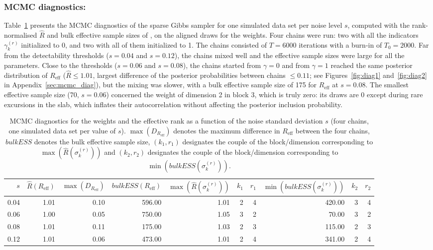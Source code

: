 \documentclass[11pt]{article}
\newcommand{\Reff}{R_{\mathrm{eff}}}
\begin{document}
\subsubsection*{MCMC diagnostics:} Table~\ref{tab:mcmc_diag} presents the MCMC diagnostics of the sparse Gibbs sampler for one simulated data set per noise level $s$, computed with the rank-normalised $\hat R$ and bulk effective sample sizes of \citet{vehtari2021}, on the aligned draws for the weights. Four chains were run: two with all the indicators $\gamma_k^{(r)}$ initialized to 0, and two with all of them initialized to 1. The chains consisted of $T=6000$ iterations with a burn-in of $T_0=2000$. Far from the detectability thresholds ($s=0.04$ and $s=0.12$), the chains mixed well and the effective sample sizes were large for all the parameters. Close to the thresholds ($s=0.06$ and $s=0.08$), the chains started from $\gamma=0$ and from $\gamma=1$ reached the same posterior distribution of $\Reff$ ($\hat R\leq1.01$, largest difference of the posterior probabilities between chains $\leq0.11$; see Figures~\ref{fig:diag1} and~\ref{fig:diag2} in Appendix~\ref{sec:mcmc_diag}), but the mixing was slower, with a bulk effective sample size of 175 for $\Reff$ at $s=0.08$. The smallest effective sample size (70, $s=0.06$) concerned the weight of dimension 2 in block 3, which is truly zero: its draws are 0 except during rare excursions in the slab, which inflates their autocorrelation without affecting the posterior inclusion probability.  
\begin{table}[ht]
\centering
\begin{tabular}{rrrrrrrrrr}
  \hline
$s$ & $\hat R(\Reff)$ & $\max(D_{\Reff})$ & $bulkESS(\Reff)$ & $\max(\hat R(\sigma^{(r)}_k))$ &  $k_1$ & $r_1$ & $\min(bulkESS(\sigma^{(r)}_k))$ & $k_2$ & $r_2$ \\ 
  \hline
0.04 & 1.01 & 0.10 & 596.00 & 1.01 &   2 &   4 & 420.00 &   3 &   4 \\ 
  0.06 & 1.00 & 0.05 & 750.00 & 1.05 &   3 &   2 & 70.00 &   3 &   2 \\ 
  0.08 & 1.01 & 0.11 & 175.00 & 1.03 &   2 &   3 & 115.00 &   2 &   3 \\ 
  0.12 & 1.01 & 0.06 & 473.00 & 1.01 &   2 &   4 & 341.00 &   2 &   4 \\ 
   \hline
\end{tabular}
\caption{MCMC diagnostics for the weights and the effective rank as a function of the noise standard deviation $s$ (four chains, one simulated data set per value of $s$). $\max(D_{\Reff})$ denotes the maximum difference in $\Reff$ between the four chains, $bulkESS$ denotes the bulk effective sample size, $(k_1,r_1)$ designates the couple of the block/dimension corresponding to $\max(\hat R(\sigma^{(r)}_k))$ and $(k_2,r_2)$ designates the couple of the block/dimension corresponding to $\min(bulkESS(\sigma^{(r)}_k))$. \label{tab:mcmc_diag}}
\end{table}
\end{document}
